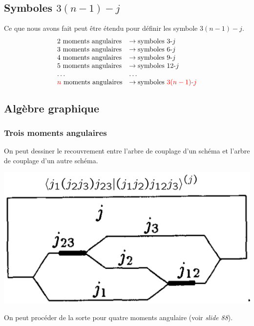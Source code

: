 \subsection{Symboles $3(n-1)-j$}
Ce que nous avons fait peut être étendu pour définir les symbole $3(n-1)-j$.
$$\begin{array}{ll}
2~\mbox{moments angulaires}  &   
\rightarrow \mbox{symboles}~3\mbox{-}j \\
3~\mbox{moments angulaires}  &   
\rightarrow  \mbox{symboles}~6\mbox{-}j \\
4~\mbox{moments angulaires}  &   
\rightarrow \mbox{symboles}~9\mbox{-}j \\
5~\mbox{moments angulaires}  &   
\rightarrow \mbox{symboles}~12\mbox{-}j\\
\ldots & \ldots \\
{\color{red} n} ~\mbox{moments angulaires}  &   
\rightarrow  \mbox{symboles}~{\color{red} 3(n-1)\mbox{-}j  }
\end{array}$$

\subsection{Algèbre graphique}
\subsubsection{Trois moments angulaires}
On peut dessiner le recouvrement entre l'arbre de couplage d'un schéma et l'arbre de 
couplage d'un autre schéma. 
\begin{center}
\includegraphics[scale=0.5]{ch1/image15}
\end{center}
On peut procéder de la sorte pour quatre moments angulaire (voir \textit{slide 88}).

